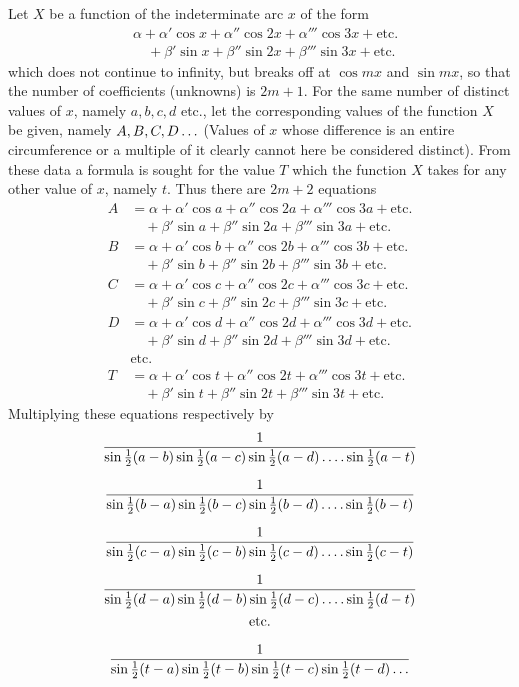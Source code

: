 \begingroup
\renewcommand{\arraystretch}{1.45}
Let \(X\) be a function of the indeterminate arc \(x\) of the form
\[
\begin{aligned}
&\alpha+\alpha'\cos x+\alpha''\cos 2x+\alpha'''\cos 3x+\text{etc.}\\
&\quad+\beta'\sin x+\beta''\sin 2x+\beta'''\sin 3x+\text{etc.}
\end{aligned}
\]
which does not continue to infinity, but breaks off at \(\cos mx\) and \(\sin mx\), so
that the number of coefficients (unknowns) is \(2m+1\). For the same number of distinct values of \(x\), namely \(a,b,c,d\) etc., let the corresponding values of the function \(X\) be given,
namely \(A,B,C,D\mathinner{.\,.\,.}\) (Values of \(x\) whose difference is an entire circumference or a multiple of it clearly cannot here be considered distinct). From
these data a formula is sought for the value \(T\) which the function \(X\) takes for any other
value of \(x\), namely \(t\). Thus there are \(2m+2\) equations
\[
\begin{aligned}
A&=\alpha+\alpha'\cos a+\alpha''\cos 2a+\alpha'''\cos 3a+\text{etc.}\\
 &\quad+\beta'\sin a+\beta''\sin 2a+\beta'''\sin 3a+\text{etc.}\\
B&=\alpha+\alpha'\cos b+\alpha''\cos 2b+\alpha'''\cos 3b+\text{etc.}\\
 &\quad+\beta'\sin b+\beta''\sin 2b+\beta'''\sin 3b+\text{etc.}\\
C&=\alpha+\alpha'\cos c+\alpha''\cos 2c+\alpha'''\cos 3c+\text{etc.}\\
 &\quad+\beta'\sin c+\beta''\sin 2c+\beta'''\sin 3c+\text{etc.}\\
D&=\alpha+\alpha'\cos d+\alpha''\cos 2d+\alpha'''\cos 3d+\text{etc.}\\
 &\quad+\beta'\sin d+\beta''\sin 2d+\beta'''\sin 3d+\text{etc.}\\
 &\text{etc.}\\
T&=\alpha+\alpha'\cos t+\alpha''\cos 2t+\alpha'''\cos 3t+\text{etc.}\\
 &\quad+\beta'\sin t+\beta''\sin 2t+\beta'''\sin 3t+\text{etc.}
\end{aligned}
\]
Multiplying these equations respectively by
\[
\begin{gathered}
\frac{1}{\sin\tfrac12(a-b)\sin\tfrac12(a-c)\sin\tfrac12(a-d)\mathinner{.\,.\,.\,.}\sin\tfrac12(a-t)}\\[6pt]
\frac{1}{\sin\tfrac12(b-a)\sin\tfrac12(b-c)\sin\tfrac12(b-d)\mathinner{.\,.\,.\,.}\sin\tfrac12(b-t)}\\[6pt]
\frac{1}{\sin\tfrac12(c-a)\sin\tfrac12(c-b)\sin\tfrac12(c-d)\mathinner{.\,.\,.\,.}\sin\tfrac12(c-t)}\\[6pt]
\frac{1}{\sin\tfrac12(d-a)\sin\tfrac12(d-b)\sin\tfrac12(d-c)\mathinner{.\,.\,.\,.}\sin\tfrac12(d-t)}\\
\text{etc.}\\[6pt]
\frac{1}{\sin\tfrac12(t-a)\sin\tfrac12(t-b)\sin\tfrac12(t-c)\sin\tfrac12(t-d)\mathinner{.\,.\,.}}
\end{gathered}
\]
